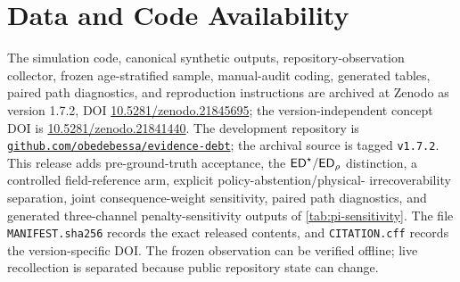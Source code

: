 \section{Data and Code Availability}
\label{sec:availability}

The simulation code, canonical synthetic outputs, repository-observation collector,
frozen age-stratified sample, manual-audit coding, generated tables, paired path
diagnostics, and reproduction instructions are archived at Zenodo as version 1.7.2,
DOI \href{https://doi.org/10.5281/zenodo.21845695}{10.5281/zenodo.21845695}; the
version-independent concept DOI is
\href{https://doi.org/10.5281/zenodo.21841440}{10.5281/zenodo.21841440}. The
development repository is
\href{https://github.com/obedebessa/evidence-debt}{\texttt{github.com/obedebessa/evidence-debt}};
the archival source is tagged \texttt{v1.7.2}. This release adds pre-ground-truth
acceptance, the $\mathsf{ED}^{\star}/\mathsf{ED}_\rho$
distinction, a controlled field-reference arm, explicit policy-abstention/physical-
irrecoverability separation, joint consequence-weight sensitivity, paired path
diagnostics, and generated three-channel
penalty-sensitivity outputs of \cref{tab:pi-sensitivity}. The file
\texttt{MANIFEST.sha256} records the exact released contents, and
\texttt{CITATION.cff} records the version-specific DOI. The frozen observation can
be verified offline; live recollection is separated because public repository state
can change.
